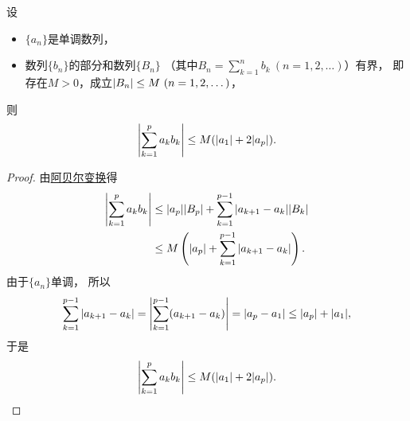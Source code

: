 \begin{lemma}[阿贝尔引理]\label{theorem:无穷级数.阿贝尔引理}
设\begin{itemize}
	\item \(\{a_n\}\)是单调数列，
	\item 数列\(\{b_n\}\)的部分和数列\(\{B_n\}\)
	（其中\(B_n = \sum_{k=1}^n b_k\ (n=1,2,\dotsc)\)）有界，
	即存在\(M>0\)，成立\(\abs{B_n} \leq M\ (n=1,2,\dotsc)\)，
\end{itemize}
则\[
	\abs{\sum_{k=1}^p a_k b_k}
	\leq M(\abs{a_1} + 2 \abs{a_p}).
\]
\begin{proof}
由\hyperref[equation:无穷级数.阿贝尔的分部求和公式]{阿贝尔变换}得\begin{align*}
	\abs{\sum_{k=1}^p a_k b_k}
	&\leq \abs{a_p} \abs{B_p} + \sum_{k=1}^{p-1} \abs{a_{k+1} - a_k} \abs{B_k} \\
	&\leq M \left(
		\abs{a_p}
		+ \sum_{k=1}^{p-1} \abs{a_{k+1} - a_k}
	\right).
\end{align*}
由于\(\{a_n\}\)单调，
所以\[
	\sum_{k=1}^{p-1} \abs{a_{k+1} - a_k}
	= \abs{\sum_{k=1}^{p-1} (a_{k+1} - a_k)}
	= \abs{a_p - a_1}
	\leq \abs{a_p} + \abs{a_1},
\]
于是\[
	\abs{\sum_{k=1}^p a_k b_k}
	\leq M(\abs{a_1} + 2 \abs{a_p}).
	\qedhere
\]
\end{proof}
\end{lemma}

